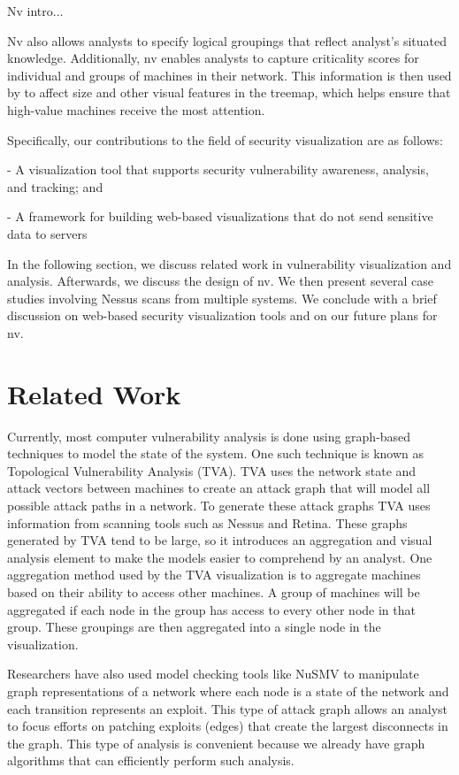 \documentclass{acm_proc_article-sp}
\begin{document}
Nv intro...

Nv also allows analysts to specify logical groupings that reflect analyst's situated knowledge\cite{Goodall:2004}. Additionally, nv enables analysts to capture criticality scores for individual and groups of machines in their network. This information is then used by to affect size and other visual features in the treemap, which helps ensure that high-value machines receive the most attention.

Specifically, our contributions to the field of security visualization are as follows:

- A visualization tool that supports security vulnerability awareness, analysis, and tracking; and

- A framework for building web-based visualizations that do not send sensitive data to servers

In the following section, we discuss related work in vulnerability visualization and analysis. Afterwards, we discuss the design of nv. We then present several case studies involving Nessus scans from multiple systems. We conclude with a brief discussion on web-based security visualization tools and on our future plans for nv.

\section{Related Work}

Currently, most computer vulnerability analysis is done using graph-based
techniques to model the state of the system. One such technique is known as
Topological Vulnerability Analysis (TVA). TVA uses the network state and attack
vectors between machines to create an attack graph that will model all possible attack paths in a
network. To generate these attack graphs TVA uses information from scanning
tools such as Nessus and Retina. These graphs generated by TVA tend to be 
large, so it introduces an aggregation and visual analysis element to make the
models easier to comprehend by an analyst. One aggregation method used by the TVA
visualization is to aggregate machines based on their ability to access other machines. A group of
machines will be aggregated if each node in the group has access to every other
node in that group.
These groupings are then aggregated into a single node in the visualization.
\cite{Noel:2009bu} 

Researchers have also used model checking tools like NuSMV to manipulate graph
representations of a network where each node is a state of the network and each
transition represents an exploit.  This type of attack graph allows an analyst
to focus efforts on patching exploits (edges) that create the largest
disconnects in the graph. This type of analysis is convenient because we
already have graph algorithms that can efficiently perform such analysis.
\cite{Ammann:2002ty}
\end{document}
